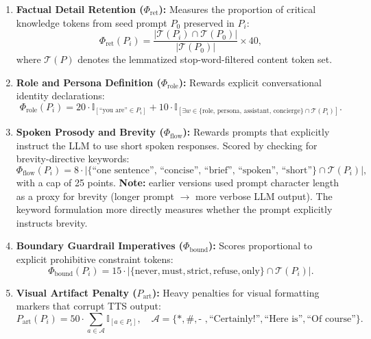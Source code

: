 \documentclass[11pt,a4paper]{article}
\begin{document}
\begin{enumerate}[leftmargin=*]
    \item \textbf{Factual Detail Retention ($\Phi_{\text{ret}}$):} Measures the proportion of critical knowledge tokens from seed prompt $P_0$ preserved in $P_i$:
    \begin{equation}
    \Phi_{\text{ret}}(P_i) = \frac{|\mathcal{T}(P_i) \cap \mathcal{T}(P_0)|}{|\mathcal{T}(P_0)|} \times 40,
    \label{eq:ret}
    \end{equation}
    where $\mathcal{T}(P)$ denotes the lemmatized stop-word-filtered content token set.

    \item \textbf{Role and Persona Definition ($\Phi_{\text{role}}$):} Rewards explicit conversational identity declarations:
    \begin{equation}
    \Phi_{\text{role}}(P_i) = 20 \cdot \mathbb{I}_{[\text{``you are''} \in P_i]} + 10 \cdot \mathbb{I}_{[\exists w \in \{\text{role, persona, assistant, concierge}\} \cap \mathcal{T}(P_i)]}.
    \label{eq:role}
    \end{equation}

    \item \textbf{Spoken Prosody and Brevity ($\Phi_{\text{flow}}$):} Rewards prompts that explicitly instruct the LLM to use short spoken responses. Scored by checking for brevity-directive keywords:
    \begin{equation}
    \Phi_{\text{flow}}(P_i) = 8 \cdot \bigl|\{\text{``one sentence'', ``concise'', ``brief'', ``spoken'', ``short''}\} \cap \mathcal{T}(P_i)\bigr|,
    \label{eq:flow}
    \end{equation}
    with a cap of 25 points. \textbf{Note:} earlier versions used prompt character length as a proxy for brevity (longer prompt $\to$ more verbose LLM output). The keyword formulation more directly measures whether the prompt explicitly instructs brevity.

    \item \textbf{Boundary Guardrail Imperatives ($\Phi_{\text{bound}}$):} Scores proportional to explicit prohibitive constraint tokens:
    \begin{equation}
    \Phi_{\text{bound}}(P_i) = 15 \cdot \bigl|\{\text{never}, \text{must}, \text{strict}, \text{refuse}, \text{only}\} \cap \mathcal{T}(P_i)\bigr|.
    \label{eq:bound}
    \end{equation}

    \item \textbf{Visual Artifact Penalty ($P_{\text{art}}$):} Heavy penalties for visual formatting markers that corrupt TTS output:
    \begin{equation}
    P_{\text{art}}(P_i) = 50 \cdot \sum_{a \in \mathcal{A}} \mathbb{I}_{[a \in P_i]},
    \quad \mathcal{A} = \bigl\{\texttt{*}, \texttt{\#}, \texttt{- }, \text{``Certainly!''}, \text{``Here is''}, \text{``Of course''}\bigr\}.
    \label{eq:art}
    \end{equation}
\end{enumerate}
\end{document}
